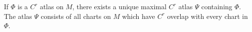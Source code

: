 If $\Phi$ is a $C^r$ atlas on $M$, there exists a unique maximal $C^r$ atlas $\Psi$ containing $\Phi$. The atlas $\Psi$ consists of all charts on $M$ which have $C^r$ overlap with every chart in $\Phi$.
